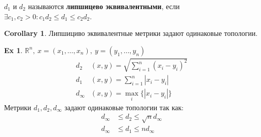 \documentclass[11pt]{book}
\newcommand{\R}{\mathbb{R}}
\renewcommand{\le}{\leqslant}
\theoremstyle{definition}
\theoremstyle{plain}
\theoremstyle{plain}
\theoremstyle{definition}
\newtheorem*{ex}{Ex}
\newtheorem*{cor}{Corollary}
\theoremstyle{remark}
\begin{document}
\begin{defn}
    $ d_1$ и $ d_2$ называются {\bf липшицево эквивалентными}, если $ \exists c_1, c_2 >0: c_1 d_2 \le  d_1 \le c_2d_2$.
\end{defn}
\begin{cor}
    Липшициво эквивалентные метрики задают одинаковые топологии.
\end{cor}
\begin{ex}
    $ \R^{n} , ~ x=(x_1, \ldots , x_{n}), ~ y=(y_1, \ldots , y_{n})$
    \begin{align*}
	d_2 & (x, y) = \sqrt{\sum_{i=1}^{n} (x_i - y_{i})^2}\\
	d_1 & (x, y) = {\sum_{i=1}^{n} |x_i - y_{i}|}\\
	d_{\infty} & (x, y) = {\max_{i} \{|x_i - y_{i}|\}}
    \end{align*}
Метрики $ d_1, d_2, d_{\infty}$  задают одинаковые топологии так как:
    \begin{align*}
	d_{\infty} & \le d_2 \le \sqrt{n} d_{\infty}\\
	d_{\infty} & \le d_1 \le n d_{\infty}
    \end{align*}
\end{ex}
\end{document}
